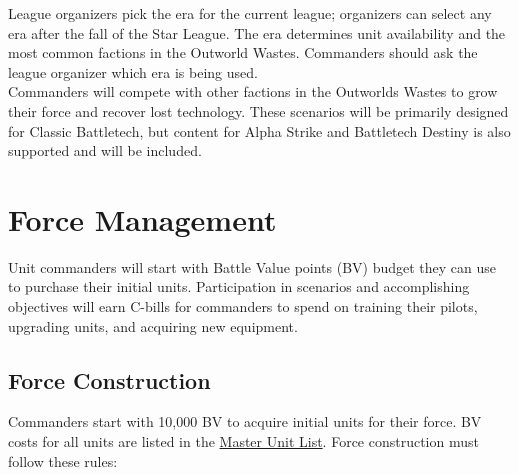 \documentclass[UTF8]{article}
\begin{document}
League organizers pick the era for the current league; organizers can select any era after the fall of the Star League.
The era determines unit availability and the most common factions in the Outworld Wastes.
Commanders should ask the league organizer which era is being used.\\ 

Commanders will compete with other factions in the Outworlds Wastes to grow their force and recover lost technology.
These scenarios will be primarily designed for Classic Battletech, but content for Alpha Strike and Battletech Destiny is also supported and will be included.\\

\newpage

\section{Force Management}

Unit commanders will start with Battle Value points (BV) budget they can use to purchase their initial units.
Participation in scenarios and accomplishing objectives will earn C-bills for commanders to spend on training their pilots, upgrading units, and acquiring new equipment.

\subsection{Force Construction}

Commanders start with 10,000 BV to acquire initial units for their force.
BV costs for all units are listed in the \href{http://www.masterunitlist.info/}{Master Unit List}.
Force construction must follow these rules:\\
\end{document}
